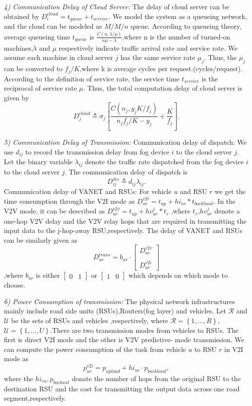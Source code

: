 \documentclass[twoside,twocolumn]{article}
\begin{document}
\textit{4) Communication Delay of Cloud Server:} The delay of cloud server can be obtained by $D_i^{cloud} = t_{queue}+t_{service}$. We model the system as a queueing network, and the cloud can be modeled as $M/M/n$ queue. According to queueing theory, average queueing time $t_{queue}$ is $\frac{C(n,\lambda/\mu)}{n\mu-\lambda}$,where n is the number of turned-on machines,$\lambda$ and $\mu$ respectively indicate traffic arrival rate and service rate. We assume each machine in cloud server $j$ has the same service rate $\mu_{j}$. Thus, the $\mu_j$ can be converted to $f_j/K$,where k is average cycles per request.(cycles/request). According to the definition of service rate, the service time $t_{service}$ is the reciprocal of service rate $\mu$. Thus, the total computation delay of cloud server is given by
$$D_j^{cloud} \triangleq \sigma_j\left[\frac{C\left(n_j,y_jK/f_j\right)}{n_jf_j/K-y_j} + \frac{K}{f_j}\right].$$

\textit{5) Communication Delay of Transmission:}
Communication delay of dispatch: We use $d_{ij}$ to record the transmission delay from fog device $i$ to the cloud server $j$. Let the binary variable $\lambda_{ij}$ denote the traffic rate dispatched from the fog device $i$ to the cloud server $j$. The communication delay of dispatch is 
$$ D_{ij}^{dis} \triangleq d_{ij}\lambda_{ij} .$$
Communication delay of VANET and RSUs: For vehicle $u$ and RSU $r$ we get the time consumption through the V2I mode as $D_{ur}^{v2i} = t_{up}+hi_{ur}*t_{backhaul}$. In the V2V mode, it can be described as $ D_{ur}^{v2v} = t_{up}+hv_{ur}^{j}*t_{v} $ ,where $t_v$,$hv_{ur}^j$ denote a one-hop V2V delay and the V2V relay hops that are required in transmitting the input data to the j-hop-away RSU,respectively.
The delay of VANET and RSUs can be similarly given as 
$$
D_{ur}^{trans} = b_{ur} \cdot \begin{bmatrix}
D_{ur}^{v2v} \\
\\
D_{ur}^{v2i}
\end{bmatrix} 
$$
,where $b_{ur}$ is either $\begin{bmatrix}
0 & 1 
\end{bmatrix} $ or $\begin{bmatrix}
1 & 0 
\end{bmatrix} $ which depends on which mode to choose. 

\textit{6) Power Consumption of transmission:} The physical network infrastructures mainly include road side units (RSUs),Routers(fog layer) and vehicles. Let $\mathcal{R}$ and $\mathcal{U}$  be the sets of RSUs and vehicles ,respectively, where $\mathcal{R}=\left\{1,\ldots,R\right\}$,$\mathcal{U}=\left\{1,\ldots,U\right\}$.There are two transmission modes from vehicles to RSUs. The first is direct V2I mode and the other is V2V predictive-
mode transmission. We can compute the power consumption of the task from vehicle $u$ to RSU $r$ in V2I mode as 
$$p_{ur}^{v2i} = p_{upload} + hi_{ur} \cdot p_{backhaul},$$ 
where the $hi_{ru},p_{backaul}$ donate the number of hops from the original RSU to the destination RSU and the cost for transmitting the output data across one road segment,respectively. 
\end{document}
